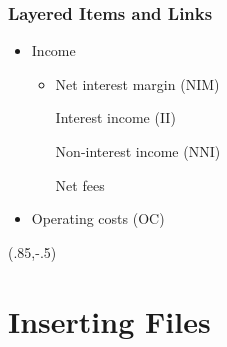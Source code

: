 \documentclass[12pt,aspectratio=169,xcolor=dvipsnames]{beamer}						%
\begin{document}
\begin{frame}[label=LinkB]
	\frametitle{Layered Items and Links}
	\begin{itemize}
		\item Income
		\begin{itemize}
				\item Net interest margin (NIM)
				\begin{itemize}
					\iftoggle{struct}{\item<2->}{\item} Interest income (II)
				\end{itemize}
				\iftoggle{struct}{\item<1->}{\item} Non-interest income (NNI)
				\begin{itemize}
					\iftoggle{long}{\item<2>}{\item} Net fees
				\end{itemize}
		\end{itemize}
		\item Operating costs (OC)
	\end{itemize}
	\begin{textblock*}{3cm}(.85\textwidth,-.5\textheight)
		\hyperlink{LinkA}{}
	\end{textblock*}
\end{frame}

\section{Inserting Files}

%
\end{document}
